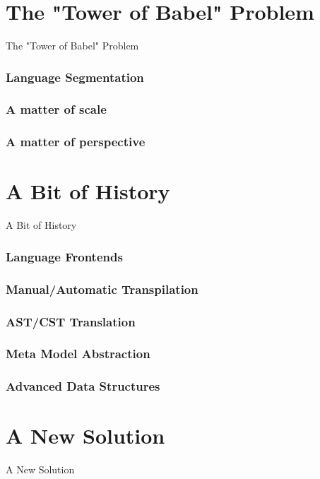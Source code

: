 \documentclass[dvipsnames, 10pt]{beamer}
\begin{document}
\section{The "Tower of Babel" Problem}
\begin{frame}
  \centering
  \Huge
  The "Tower of Babel" Problem
\end{frame}

\begin{frame}
  \frametitle{Language Segmentation}
\end{frame}

\begin{frame}
  \frametitle{A matter of scale}
\end{frame}

\begin{frame}
  \frametitle{A matter of perspective}
\end{frame}

\section{A Bit of History}
\begin{frame}
  \centering
  \Huge
  A Bit of History
\end{frame}

\begin{frame}
  \frametitle{Language Frontends}
\end{frame}

\begin{frame}
  \frametitle{Manual/Automatic Transpilation}
\end{frame}

\begin{frame}
  \frametitle{AST/CST Translation}
\end{frame}

\begin{frame}
  \frametitle{Meta Model Abstraction}
\end{frame}

\begin{frame}
  \frametitle{Advanced Data Structures}
\end{frame}

\section{A New Solution}
\begin{frame}
  \centering
  \Huge
  A New Solution
\end{frame}
\end{document}
